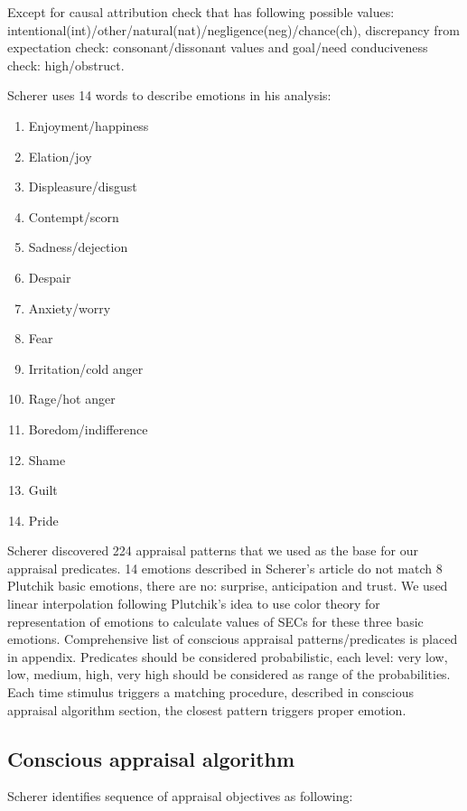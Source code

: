 Except for causal attribution check that has following possible values: intentional(int)/other/natural(nat)/negligence(neg)/chance(ch),  discrepancy from expectation check: consonant/dissonant values and goal/need conduciveness check: high/obstruct.

Scherer uses 14 words to describe emotions in his analysis:

\begin{enumerate}
 \item  Enjoyment/happiness
 \item  Elation/joy
 \item  Displeasure/disgust
 \item  Contempt/scorn
 \item  Sadness/dejection
 \item  Despair
 \item  Anxiety/worry
 \item  Fear
 \item  Irritation/cold anger
 \item  Rage/hot anger
 \item  Boredom/indifference
 \item  Shame
 \item  Guilt
 \item  Pride
\end{enumerate}

Scherer discovered 224 appraisal patterns that we used as the base for our appraisal predicates. 14 emotions described in Scherer's article do not match 8 Plutchik basic emotions, there are no: surprise, anticipation and trust. We used linear interpolation following Plutchik's idea to use color theory for representation of emotions to calculate values of SECs for these three basic emotions. Comprehensive list of conscious appraisal patterns/predicates is placed in appendix. Predicates should be considered probabilistic, each level: very low, low, medium, high, very high should be considered as range of the probabilities. Each time stimulus triggers a matching procedure, described in conscious appraisal algorithm section, the closest pattern triggers proper emotion.

\subsection{Conscious appraisal algorithm}

Scherer identifies \cite{appraisal_considered_as_a_process} sequence of appraisal objectives as following:

